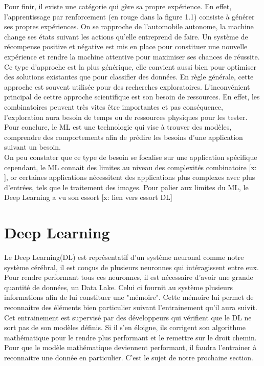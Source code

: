 \documentclass[12pt,a4paper]{report}
\begin{document}
Pour finir, il existe une catégorie qui gère sa propre expérience. En effet, l'apprentissage par renforcement (en rouge dans la figure 1.1) consiste à générer ses propres expériences. On se rapproche de l'automobile autonome, la machine change ses états suivant les actions qu'elle entreprend de faire. Un système de récompense positive et négative est mis en place pour constituer une nouvelle expérience et rendre la machine attentive pour maximiser ses chances de réussite. Ce type d'approche est la plus générique, elle convient aussi bien pour optimiser des solutions existantes que pour classifier des données. En règle générale, cette approche est souvent utilisée pour des recherches exploratoires. L'inconvénient principal de cettre approche scientifique est son besoin de ressources. En effet, les combinatoires peuvent très vites être importantes et pas conséquence, l'exploration aura besoin de temps ou de ressources physiques pour les tester.\\

Pour conclure, le ML est une technologie qui vise à trouver des modèles, comprendre des comportements afin de prédire les besoins d'une application suivant un besoin.\\

On peu constater que ce type de besoin se focalise sur une application spécifique cependant, le ML connait des limites au niveau des complexités combinatoire [x: ], or certaines applications nécessitent des applications plus complexes avec plus d'entrées, tels que le traitement des images. Pour palier aux limites du ML, le Deep Learning a vu son essort [x: lien vers essort DL]


\section{Deep Learning}

Le Deep Learning(DL) est représentatif d'un système neuronal comme notre système cérébral, il est conçus de plusieurs neuronnes qui intéragissent entre eux. Pour rendre performant tous ces neuronnes, il est nécessaire d'avoir une grande quantité de données, un Data Lake. Celui ci fournit au système plusieurs informations afin de lui constituer une "mémoire". Cette mémoire lui permet de reconnaitre des éléments bien particulier suivant l'entrainement qu'il aura suivit. Cet entrainement est supervisé par des développeurs qui vérifient que le DL ne sort pas de son modèles définis.
Si il s'en éloigne, ils corrigent son algorithme mathématique pour le rendre plus performant et le remettre sur le droit chemin. Pour que le modèle mathématique deviennent performant, il faudra l'entrainer à reconnaitre une donnée en particulier. C'est le sujet de notre prochaine section.
\end{document}
